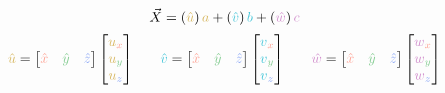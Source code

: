 \documentclass[preview]{standalone}
\begin{document}
$$\vec{X} = \left(\textcolor[HTML]{d7b760}{\hat{u}}\right)\textcolor[HTML]{d7b760}{a} + \left(\textcolor[HTML]{46c6d9}{\hat{v}}\right)\textcolor[HTML]{46c6d9}{b} + \left(\textcolor[HTML]{d290cd}{\hat{w}}\right)\textcolor[HTML]{d290cd}{c}$$
$$\begin{align*}
\textcolor[HTML]{d7b760}{\hat{u}} = \begin{bmatrix}\textcolor[HTML]{fea294}{\hat{x}}&\textcolor[HTML]{81cb8f}{\hat{y}}&\textcolor[HTML]{91abf6}{\hat{z}}\end{bmatrix}\begin{bmatrix}\textcolor[HTML]{d7b760}{u}_{\textcolor[HTML]{fea294}{x}}\\\textcolor[HTML]{d7b760}{u}_{\textcolor[HTML]{81cb8f}{y}}\\\textcolor[HTML]{d7b760}{u}_{\textcolor[HTML]{91abf6}{z}}\end{bmatrix}
&\quad&
\textcolor[HTML]{46c6d9}{\hat{v}} = \begin{bmatrix}\textcolor[HTML]{fea294}{\hat{x}}&\textcolor[HTML]{81cb8f}{\hat{y}}&\textcolor[HTML]{91abf6}{\hat{z}}\end{bmatrix}\begin{bmatrix}\textcolor[HTML]{46c6d9}{v}_{\textcolor[HTML]{fea294}{x}}\\\textcolor[HTML]{46c6d9}{v}_{\textcolor[HTML]{81cb8f}{y}}\\\textcolor[HTML]{46c6d9}{v}_{\textcolor[HTML]{91abf6}{z}}\end{bmatrix}
&\quad&
\textcolor[HTML]{d290cd}{\hat{w}} = \begin{bmatrix}\textcolor[HTML]{fea294}{\hat{x}}&\textcolor[HTML]{81cb8f}{\hat{y}}&\textcolor[HTML]{91abf6}{\hat{z}}\end{bmatrix}\begin{bmatrix}\textcolor[HTML]{d290cd}{w}_{\textcolor[HTML]{fea294}{x}}\\\textcolor[HTML]{d290cd}{w}_{\textcolor[HTML]{81cb8f}{y}}\\\textcolor[HTML]{d290cd}{w}_{\textcolor[HTML]{91abf6}{z}}\end{bmatrix}
\end{align*}$$
\end{document}
